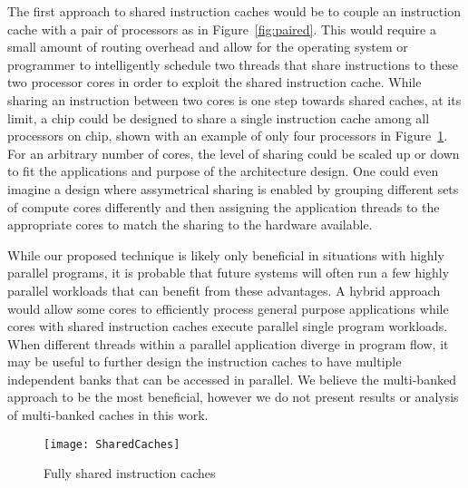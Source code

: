 The first approach to shared instruction caches would be to couple an
instruction cache with a pair of processors as in
Figure~\ref{fig:paired}. 
This would require a small amount of routing overhead and allow for the
operating system or programmer to intelligently schedule two threads 
that share instructions to these two processor cores in order to exploit 
the shared instruction cache.
While sharing an instruction between two cores is one step towards shared
caches, at its limit, a chip could be designed to share a single instruction
cache among all processors on chip, shown with an example of only four
processors in Figure~\ref{fig:shared}.
For an arbitrary number of cores, the level of sharing could be
scaled up or down to fit the applications and purpose of the
architecture design.
One could even imagine a design where assymetrical sharing is enabled
by grouping different sets of compute cores differently and then
assigning the application threads to the appropriate cores to match
the sharing to the hardware available.

While our proposed technique is likely only beneficial in situations
with highly parallel programs, it is probable that future systems will
often run a few highly parallel workloads that can benefit from these
advantages. 
A hybrid approach would allow some cores to efficiently process general 
purpose applications while cores with shared instruction caches execute
parallel single program workloads.
When different threads within a parallel application diverge in program flow,
it may be useful to further design the instruction caches to have multiple
independent banks that can be accessed in parallel.
We believe the multi-banked approach to be the most beneficial, however we do not 
present results or analysis of multi-banked caches in this work. 


\begin{figure}[ht!]
\centering
\texttt{[image: SharedCaches]}
\caption{Fully shared instruction caches}
\label{fig:shared}
\end{figure}



